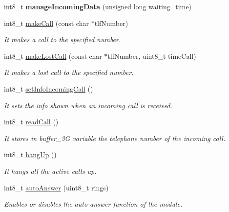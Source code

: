 \begin{DoxyCompactItemize}
\item 
int8\+\_\+t {\bfseries manage\+Incoming\+Data} (unsigned long waiting\+\_\+time)\hypertarget{class_wasp3_g_a7c385a93e8c4441564ca44937258044b}{}\label{class_wasp3_g_a7c385a93e8c4441564ca44937258044b}

\item 
int8\+\_\+t \hyperlink{class_wasp3_g_a4984e16f63daa6159be24c17ecd1ae78}{make\+Call} (const char $\ast$tlf\+Number)
\begin{DoxyCompactList}\small\item\em It makes a call to the specified number. \end{DoxyCompactList}\item 
int8\+\_\+t \hyperlink{class_wasp3_g_a3b8b1daa2901377c9a7ea977646823d1}{make\+Lost\+Call} (const char $\ast$tlf\+Number, uint8\+\_\+t time\+Call)
\begin{DoxyCompactList}\small\item\em It makes a lost call to the specified number. \end{DoxyCompactList}\item 
int8\+\_\+t \hyperlink{class_wasp3_g_ac0485f841a59d28cb86fce671dffe565}{set\+Info\+Incoming\+Call} ()
\begin{DoxyCompactList}\small\item\em It sets the info shown when an incoming call is received. \end{DoxyCompactList}\item 
int8\+\_\+t \hyperlink{class_wasp3_g_a7776261de0fb6fe36d688d5a23aac0f5}{read\+Call} ()
\begin{DoxyCompactList}\small\item\em It stores in \textquotesingle{}buffer\+\_\+3G\textquotesingle{} variable the telephone number of the incoming call. \end{DoxyCompactList}\item 
int8\+\_\+t \hyperlink{class_wasp3_g_a70f01b2a0023748290d0161ac6f6cc2b}{hang\+Up} ()
\begin{DoxyCompactList}\small\item\em It hangs all the active calls up. \end{DoxyCompactList}\item 
int8\+\_\+t \hyperlink{class_wasp3_g_a720260cd8df85cd377c899ad669e2200}{auto\+Answer} (uint8\+\_\+t rings)
\begin{DoxyCompactList}\small\item\em Enables or disables the auto-\/answer function of the module. \end{DoxyCompactList}\item 

\end{DoxyCompactItemize}
